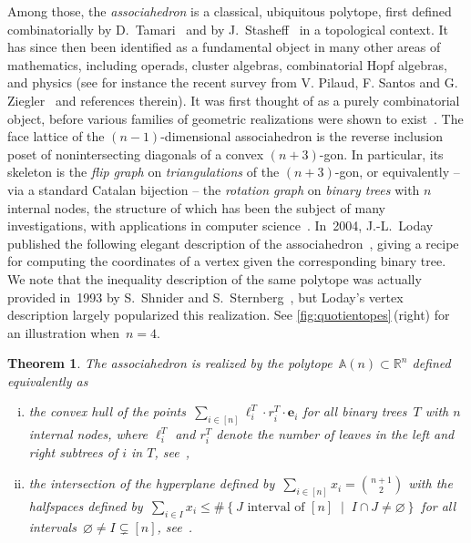 \documentclass{amsart}
\newtheorem{theorem}{Theorem}%
\theoremstyle{definition}
\newcommand{\R}{\mathbb{R}} %
\renewcommand{\b}[1]{{\boldsymbol{#1}}} %
\newcommand{\set}[2]{\left\{ #1 \;\middle|\; #2 \right\}} %
\newcommand{\darkblue}{\color{darkblue}} %
\newcommand{\defn}[1]{\textsl{\darkblue #1}} %
\newcommand{\polytope}[1]{\mathds{#1}} %
\newcommand{\Asso}{\polytope{A}} %
\begin{document}
Among those, the \defn{associahedron} is a classical, ubiquitous polytope, first defined combinatorially by D.~Tamari~\cite{T51} and by J.~Stasheff~\cite{S63} in a topological context.
It has since then been identified as a fundamental object in many other areas of mathematics, including operads, cluster algebras, combinatorial Hopf algebras, and physics (see for instance the recent survey from V. Pilaud, F. Santos and G. Ziegler~\cite{PilaudSantosZiegler} and references therein).
It was first thought of as a purely combinatorial object, before various families of geometric realizations were shown to exist~\cite{MR1022776,MR1941227,MR2108555,MR3437894,MR2321739}.
The face lattice of the $(n-1)$-dimensional associahedron is the reverse inclusion poset of nonintersecting diagonals of a convex $(n+3)$-gon.
In particular, its skeleton is the \defn{flip graph} on \defn{triangulations} of the $(n+3)$-gon, or equivalently -- via a standard Catalan bijection -- the \defn{rotation graph} on \defn{binary trees} with $n$ internal nodes, the structure of which has been the subject of many investigations, with applications in computer science~\cite{MR928904,MR3197650}.
In~2004, J.-L.~Loday published the following elegant description of the associahedron~\cite{MR2108555}, giving a recipe for computing the coordinates of a vertex given the corresponding binary tree.
We note that the inequality description of the same polytope was actually provided in~1993 by S.~Shnider and S.~Sternberg~\cite{ShniderSternberg}, but Loday's vertex description largely popularized this realization.
See \cref{fig:quotientopes}\,(right) for an illustration when~$n = 4$.

\begin{theorem}
  \label{thm:loday}
  The associahedron is realized by the polytope~$\Asso (n) \subset \R^n$ defined equivalently as
  \begin{enumerate}[(i)]
  \item the convex hull of the points~$\sum_{i\in [n]} \ell^T_i\cdot r^T_i \cdot \b{e}_i$ for all binary trees~$T$ with $n$ internal nodes, where $\ell^T_i$ and $r^T_i$ denote the number of leaves in the left and right subtrees of $i$ in $T$, see~\cite{MR2108555},
  \item the intersection of the hyperplane defined by~$\sum_{i \in [n]} x_i = \binom{n+1}{2}$ with the halfspaces defined by~$\sum_{i \in I} x_i \le \#\set{J \text{ interval of } [n]}{I \cap J \ne \varnothing}$ for all intervals~$\varnothing \ne I \subsetneq [n]$, see~\cite{ShniderSternberg}.
  \end{enumerate}
\end{theorem}
\end{document}

